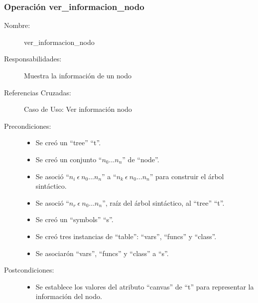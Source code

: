 \subsubsection{Operación ver\_informacion\_nodo}
\FloatBarrier
\begin{framed}
	\begin{description}
		\item [Nombre:] ver\_informacion\_nodo
		\item [Responsabilidades:] Muestra la información de un nodo
		\item [Referencias Cruzadas: ] Caso de Uso: Ver información nodo
      \item [Precondiciones:] \hfill
         \begin {itemize}
         \item Se creó un ``tree'' ``t''.
         \item Se creó un conjunto ``$n_0...n_n$'' de ``node''.
         \item Se asoció ``$n_i\ \epsilon\ n_0...n_n$'' a ``$n_k\ \epsilon\ n_0...n_n$'' para construir el árbol sintáctico.
         \item Se asoció  ``$n_r\ \epsilon\ n_0...n_n$'', raíz del árbol sintáctico, al ``tree'' ``t''.
         \item Se creó un ``symbols'' ``s''.
         \item Se creó tres instancias de ``table'': ``vars'', ``funcs'' y ``class''.
         \item Se asociarón ``vars'', ``funcs'' y ``class'' a ``s''.
      \end{itemize}
      \item [Postcondiciones:] \hfill
      \begin {itemize}
         \item Se establece los valores del atributo ``canvas'' de ``t'' para representar la información del nodo.
      \end{itemize}
	\end{description} 
\end{framed}
\FloatBarrier

